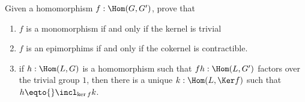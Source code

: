\begin{xca}
  Given a homomorphism $f:\Hom(G,G')$, prove that
  \begin{enumerate}
  \item $f$ is a monomorphism if and only if the kernel is trivial
  \item $f$ is an epimorphims if and only if the cokernel is contractible.
  \item if $h:\Hom(L,G)$ is a homomorphism such that $fh:\Hom(L,G')$ factors over the trivial group $1$, then there is a unique $k:\Hom(L,\Ker f)$ such that $h\eqto{}\incl_{\ker f}k$.
  \end{enumerate}
\end{xca}


